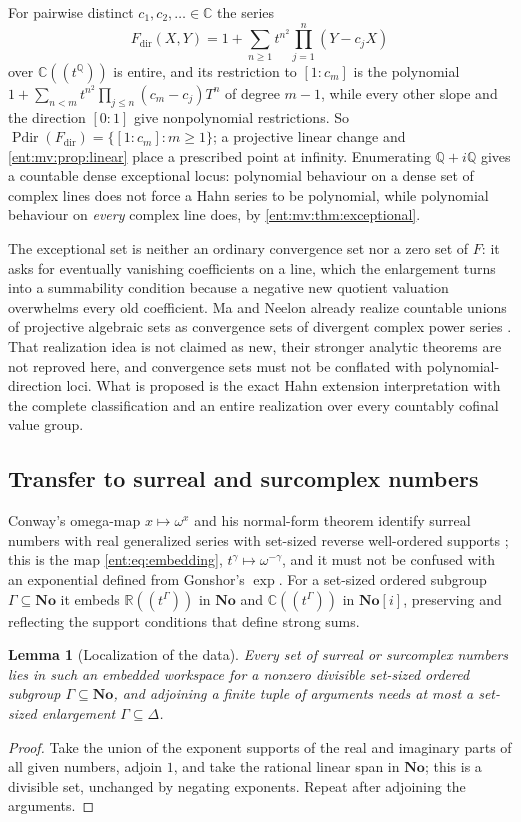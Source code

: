 \documentclass[11pt]{article}
\theoremstyle{plain}
\newtheorem{lemma}[lemma]{Lemma}
\theoremstyle{plain}
\theoremstyle{plain}
\theoremstyle{definition}
\theoremstyle{definition}
\theoremstyle{definition}
\theoremstyle{definition}
\theoremstyle{remark}
\newcommand{\C}{\mathbb C}\newcommand{\R}{\mathbb R}
\newcommand{\Q}{\mathbb Q}\newcommand{\Z}{\mathbb Z}\newcommand{\N}{\mathbb N}
\newcommand{\No}{\mathbf{No}}
\DeclareMathOperator{\Pdir}{Pdir}\DeclareMathOperator{\Adm}{Adm}
\begin{document}
For pairwise distinct $c_1,c_2,\ldots\in\C$ the series
\[
 F_{\mathrm{dir}}(X,Y)=1+\sum_{n\ge1}t^{n^2}\prod_{j=1}^n(Y-c_jX)
\]
over $\C((t^\Q))$ is entire, and its restriction to $[1:c_m]$ is the
polynomial $1+\sum_{n<m}t^{n^2}\prod_{j\le n}(c_m-c_j)T^n$ of degree $m-1$,
while every other slope and the direction $[0:1]$ give nonpolynomial
restrictions. So $\Pdir(F_{\mathrm{dir}})=\{[1:c_m]:m\ge1\}$; a projective
linear change and \cref{ent:mv:prop:linear} place a prescribed point at
infinity. Enumerating $\Q+i\Q$ gives a countable dense exceptional locus:
polynomial behaviour on a dense set of complex lines does not force a Hahn
series to be polynomial, while polynomial behaviour on \emph{every} complex
line does, by \cref{ent:mv:thm:exceptional}.

The exceptional set is neither an ordinary convergence set nor a zero set of
$F$: it asks for eventually vanishing coefficients on a line, which the
enlargement turns into a summability condition because a negative new
quotient valuation overwhelms every old coefficient. Ma and Neelon already
realize countable unions of projective algebraic sets as convergence sets of
divergent complex power series \cite[Corollary~4.19]{MaNeelon}. That
realization idea is not claimed as new, their stronger analytic theorems are
not reproved here, and convergence sets must not be conflated with
polynomial-direction loci. What is proposed is the exact Hahn extension
interpretation with the complete classification and an entire realization
over every countably cofinal value group.

\subsection{Transfer to surreal and surcomplex numbers}
\label{ent:mv:subsec:surreal}
Conway's omega-map $x\mapsto\omega^x$ and his normal-form theorem identify
surreal numbers with real generalized series with set-sized reverse
well-ordered supports \cite[Theorem~10.2]{Berarducci}; this is the map
\eqref{ent:eq:embedding}, $t^\gamma\mapsto\omega^{-\gamma}$, and it must not
be confused with an exponential defined from Gonshor's $\exp$. For a
set-sized ordered subgroup $\Gamma\subseteq\No$ it embeds $\R((t^\Gamma))$ in
$\No$ and $\C((t^\Gamma))$ in $\No[i]$, preserving and reflecting the support
conditions that define strong sums.

\begin{lemma}[Localization of the data]\label{ent:mv:lem:localize}
Every set of surreal or surcomplex numbers lies in such an embedded workspace
for a nonzero divisible set-sized ordered subgroup $\Gamma\subseteq\No$, and
adjoining a finite tuple of arguments needs at most a set-sized enlargement
$\Gamma\subseteq\Delta$.
\end{lemma}
\begin{proof}
Take the union of the exponent supports of the real and imaginary parts of
all given numbers, adjoin $1$, and take the rational linear span in $\No$;
this is a divisible set, unchanged by negating exponents. Repeat after
adjoining the arguments.
\end{proof}
\end{document}
